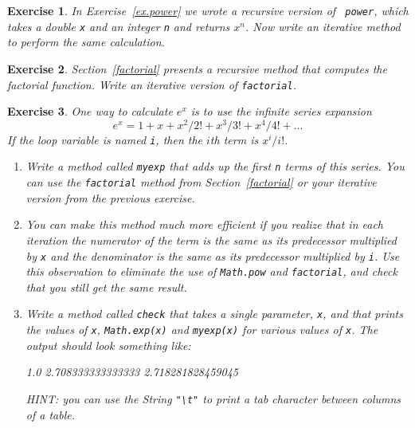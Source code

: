 \documentclass[12pt]{book}
\theoremstyle{exercise}
\newtheorem{exercise}{Exercise}[chapter]
\begin{document}
\begin{exercise}
In Exercise~\ref{ex.power} we wrote a recursive version of {\tt
power}, which takes a double {\tt x} and an integer {\tt n} and
returns $x^n$.  Now write an iterative method to perform the same
calculation.
\end{exercise}

\begin{exercise}
Section~\ref{factorial} presents a recursive method
that computes the factorial function.
Write an iterative version of {\tt factorial}.
\end{exercise}

\begin{exercise}
One way to calculate $e^x$ is to use the infinite series expansion
%
\begin{equation*}
e^x = 1 + x + x^2 / 2! + x^3 / 3! + x^4 / 4! + ...
\end{equation*}
%
If the loop variable is named {\tt i}, then the $i$th term is
$x^i / i!$.

\begin{enumerate}

\item Write a method called {\tt myexp} that adds up the first {\tt n}
terms of this series.  You can use the {\tt factorial}
method from Section~\ref{factorial} or your iterative version from the
previous exercise.

\item You can make this method much more efficient if you realize that
in each iteration the numerator of the term is the same as its
predecessor multiplied by {\tt x} and the denominator is the same as
its predecessor multiplied by {\tt i}.  Use this observation to
eliminate the use of {\tt Math.pow} and {\tt factorial}, and check
that you still get the same result.

\item Write a method called {\tt check} that takes a single parameter,
{\tt x}, and that prints the values of {\tt x}, {\tt Math.exp(x)} and
{\tt myexp(x)} for various values of {\tt x}.  The output should look
something like:

\begin{verbatimtab}
1.0     2.708333333333333       2.718281828459045
\end{verbatimtab}

HINT: you can use the String {\tt "\textbackslash t"} to print a tab character
between columns of a table.


\end{enumerate}
\end{exercise}
\end{document}
